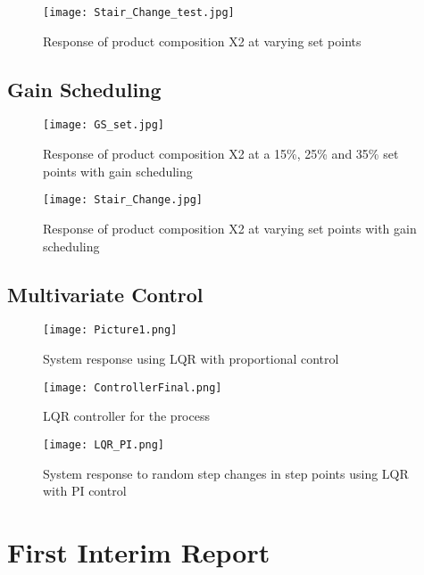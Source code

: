 \documentclass[11pt]{article}
\begin{document}
\begin{figure}[H]
    \centering
    \texttt{[image: Stair\_Change\_test.jpg]}
    \caption{Response of product composition X2 at varying set points}
    \label{fig:X2_Stairs}
\end{figure}

\subsection{Gain Scheduling}

\begin{figure}[H]
    \centering
    \texttt{[image: GS\_set.jpg]}
    \caption{Response of product composition X2 at a 15\%, 25\% and 35\% set points with gain scheduling}
    \label{fig:GS}
\end{figure}

\begin{figure}[H]
    \centering
    \texttt{[image: Stair\_Change.jpg]}
    \caption{Response of product composition X2 at varying set points with gain scheduling}
    \label{fig:X2_Stairs_schedua}
\end{figure}

\subsection{Multivariate Control}

\begin{figure}[H]
    \centering
    \texttt{[image: Picture1.png]}
    \caption{System response using LQR with proportional control}
    \label{fig:LQR P}
\end{figure}

\begin{figure}[H]
    \centering
    \texttt{[image: ControllerFinal.png]}
    \caption{LQR controller for the process}
    \label{fig:LQR Controller}
\end{figure}

\begin{figure}[H]
    \centering
    \texttt{[image: LQR\_PI.png]}
    \caption{System response to random step changes in step points using LQR with PI control}
    \label{fig:LQR Random}
\end{figure}

\section{First Interim Report}
\end{document}
